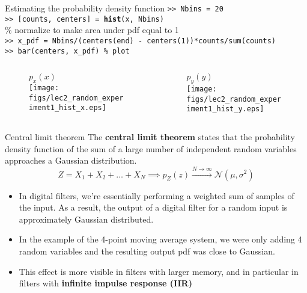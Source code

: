\documentclass[10pt, aspectratio=169]{beamer}
\begin{document}
\begin{frame}{Estimating the probability density function}
\texttt{>> Nbins = 20} \\
\texttt{>> [counts, centers] = \textbf{hist}(x, Nbins)} \\
{\color{matlabcomment}\% normalize to make area under pdf equal to 1} \\
\texttt{>> x\_pdf = Nbins/(centers(end) - centers(1))*counts/sum(counts)} \\
\texttt{>> bar(centers, x\_pdf) {\color{matlabcomment}\% plot}}
\begin{columns}
	\begin{column}{0.5\textwidth}
			\begin{figure}
				\centering
				$p_x(x)$ \\
				\texttt{[image: figs/lec2\_random\_experiment1\_hist\_x.eps]}
			\end{figure}		
	\end{column}
	\begin{column}{0.5\textwidth}
	\begin{figure}
		\centering
		$p_y(y)$ \\
		\texttt{[image: figs/lec2\_random\_experiment1\_hist\_y.eps]}
	\end{figure}		
\end{column}
\end{columns}
\end{frame}

\begin{frame}{Central limit theorem}
The \textbf{central limit theorem} states that the probability density function of the sum of a large number of independent random variables approaches a Gaussian distribution.
\begin{equation*}
Z = X_1 + X_2 + \ldots + X_N \implies p_Z(z) \xrightarrow{N\to\infty} \mathcal{N}(\mu, \sigma^2)
\end{equation*}

\begin{itemize}
	\item In digital filters, we're essentially performing a weighted sum of samples of the input. As a result, the output of a digital filter for a random input is approximately Gaussian distributed.
	\item In the example of the 4-point moving average system, we were only adding 4 random variables and the resulting output pdf was close to Gaussian. 
	\item This effect is more visible in filters with larger memory, and in particular in filters with \textbf{infinite impulse response (IIR)} 
\end{itemize}

\end{frame}
\end{document}
